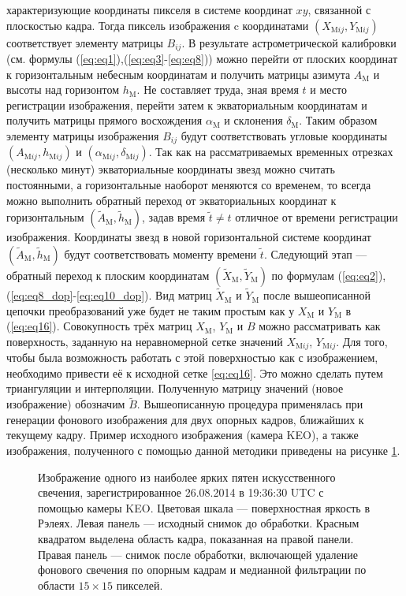 \documentclass[12pt,a4paper]{article}
\begin{document}
характеризующие координаты пикселя в системе координат $xy$, связанной с плоскостью кадра. Тогда пиксель изображения c координатами  $(X_{\text{M}ij},Y_{\text{M}ij})$ соответствует элементу матрицы $B_{ij}$. В результате астрометрической калибровки (см. формулы (\ref{eq:eq1}),(\ref{eq:eq3}-\ref{eq:eq8})) можно перейти от плоских координат к горизонтальным небесным координатам и получить матрицы азимута $A_{\text{M}}$ и высоты над горизонтом $h_{\text{M}}$. Не составляет труда, зная время $t$ и место регистрации изображения,	перейти затем к экваториальным координатам и получить матрицы прямого восхождения $\alpha_{\text{M}}$ и склонения $\delta_{\text{M}}$. Таким образом элементу матрицы изображения $B_{ij}$ будут соответствовать угловые координаты $(A_{\text{M}ij},h_{\text{M}ij})$ и $(\alpha_{\text{M}ij},\delta_{\text{M}ij})$. Так как на рассматриваемых временных отрезках (несколько минут) экваториальные координаты звезд можно считать постоянными, а горизонтальные наоборот меняются со временем, то всегда можно выполнить обратный переход от экваториальных координат к горизонтальным $(\tilde{A}_{\text{M}},\tilde{h}_{\text{M}})$, задав время $\tilde{t}\neq t$ отличное от времени регистрации изображения. Координаты звезд в новой горизонтальной системе координат $(\tilde{A}_{\text{M}},\tilde{h}_{\text{M}})$ будут соответствовать моменту времени $\tilde{t}$. Следующий этап --- обратный переход к плоским координатам $(\tilde{X}_{\text{M}},\tilde{Y}_{\text{M}})$ по формулам (\ref{eq:eq2}),(\ref{eq:eq8_dop}-\ref{eq:eq10_dop}). Вид матриц $\tilde{X}_{\text{M}}$ и $\tilde{Y}_{\text{M}}$ после вышеописанной цепочки преобразований уже будет не таким простым как у $X_{\text{M}}$ и $Y_{\text{M}}$ в (\ref{eq:eq16}). Совокупность трёх матриц $X_{\text{M}}$, $Y_{\text{M}}$ и $B$ можно рассматривать как поверхность, заданную на неравномерной сетке значений $X_{\text{M}ij}$, $Y_{\text{M}ij}$. Для того, чтобы была возможность работать с этой поверхностью как с изображением, необходимо привести её к исходной сетке \ref{eq:eq16}. Это можно сделать путем триангуляции и интерполяции. Полученную матрицу значений (новое изображение) обозначим $\tilde{B}$. Вышеописанную процедура применялась при генерации фонового изображения для двух опорных кадров, ближайших к текущему кадру. Пример исходного изображения (камера KEO), а также изображения, полученного с помощью данной методики приведены на рисунке \ref{fig:fig5}.
\begin{figure}[h]
	\caption{Изображение одного из наиболее ярких пятен искусственного свечения, зарегистрированное 26.08.2014 в 19:36:30 UTC	с помощью камеры KEO. Цветовая шкала --- поверхностная яркость в Рэлеях. Левая панель --- исходный снимок до обработки. Красным квадратом выделена область кадра, показанная на правой панели. Правая панель --- снимок после обработки, включающей удаление фонового свечения по опорным кадрам и медианной фильтрации по области $15 \times 15$ пикселей.}
	\label{fig:fig5}
\end{figure}
\end{document}
